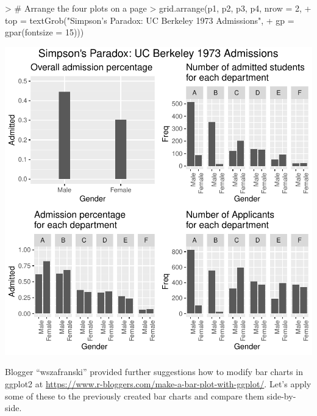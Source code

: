 \documentclass[12pt,letterpaper,final]{article}
\begin{document}
\begin{Schunk}
\begin{Sinput}
> # Arrange the four plots on a page
> grid.arrange(p1, p2, p3, p4, nrow = 2, 
+              top = textGrob("Simpson's Paradox: UC Berkeley 1973 Admissions", 
+                             gp = gpar(fontsize = 15)))
\end{Sinput}
\end{Schunk}
\includegraphics{lect_main-020}


Blogger ``wszafranski'' provided further suggestions how to modify bar charts in ggplot2
at \url{https://www.r-bloggers.com/make-a-bar-plot-with-ggplot/}.
Let's apply some of these to the previously created bar charts and compare them side-by-side.
\end{document}
